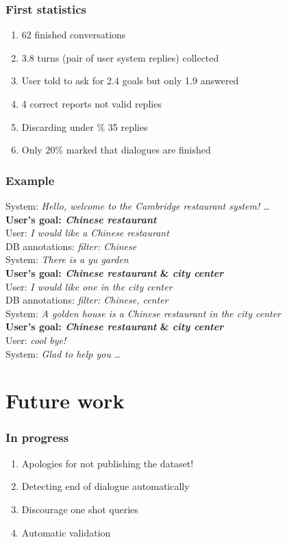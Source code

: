 \documentclass[10pt, compress,british,xcolor={svgnames,dvipsnames,x11names},trans]{beamer}
\def\sys#1{{\color{purple}System: \it #1}}
\def\usr#1{{\color{brown}User: \it #1}}
\def\api#1{{\color{blue}DB annotations: \it #1}}
\begin{document}
\begin{frame}\frametitle{First statistics}
    \begin{enumerate}
        \item 62 finished conversations
        \item 3.8 turns (pair of user system replies) collected
        \item User told to ask for 2.4 goals but only 1.9 answered 
        \item 4 correct reports not valid replies
        \item Discarding under \% 35 replies
        \item Only 20\% marked that dialogues are finished 
    \end{enumerate}
\end{frame}

\begin{frame}\frametitle{Example}
    \sys{Hello, welcome to the Cambridge restaurant system! \dots } \\
    {\bf User's goal: {\it Chinese restaurant}} \\
    \usr{I would like a Chinese restaurant} \\
    \api{filter: Chinese} \\
    \sys{There is a yu garden} \\
    {\bf User's goal: {\it Chinese restaurant} \& {\it city center}} \\
    \usr{I would like one in the city center} \\
    \api{filter: Chinese, center} \\
    \sys{A golden house is a Chinese restaurant in the city center} \\
    {\bf User's goal: {\it Chinese restaurant} \& {\it city center}} \\
    \usr{cool bye!} \\
    \sys{Glad to help you}
    \dots
\end{frame}

\section{Future work}

\begin{frame}\frametitle{In progress}
    \begin{enumerate}
        \item Apologies for not publishing the dataset!
        \item Detecting end of dialogue automatically
        \item Discourage one shot queries
        \item Automatic validation
    \end{enumerate}
\end{frame}
\end{document}
